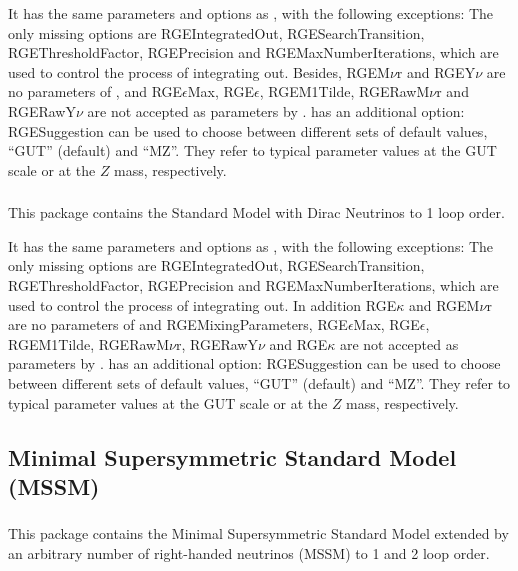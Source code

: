 \documentclass[10pt,a4paper,twoside]{scrartcl}
\begin{document}
\vspace{2ex} It has the same parameters and options as ,
with the following exceptions:  The only
missing options are RGEIntegratedOut, RGESearchTransition, RGEThresholdFactor,
RGEPrecision and RGEMaxNumberIterations, which are used to control the process
of integrating out.  Besides, RGEM$\nu$r and RGEY$\nu$ are no parameters of
, and RGE$\epsilon$Max, RGE$\epsilon$, RGEM1Tilde, RGERawM$\nu$r and RGERawY$\nu$ are not accepted as
parameters by .   has
an additional option: RGESuggestion can be used to choose between
different sets of default values, ``GUT'' (default) and ``MZ''.  They
refer to typical parameter values at the GUT scale or at the $Z$ mass,
respectively.

\subsubsection[\package{RGESMDirac}]{}
This package contains the Standard Model with Dirac Neutrinos to 1 loop order.

\vspace{2ex} It has the same parameters and options as ,
with the following exceptions:  The only
missing options are RGEIntegratedOut, RGESearchTransition, RGEThresholdFactor,
RGEPrecision and RGEMaxNumberIterations, which are used to control the process
of integrating out.  In addition RGE$\kappa$ and RGEM$\nu$r are no parameters of
 and RGEMixingParameters, RGE$\epsilon$Max, RGE$\epsilon$, RGEM1Tilde, RGERawM$\nu$r, RGERawY$\nu$ and RGE$\kappa$ are not
accepted as parameters by .
 has an additional option: RGESuggestion can be
used to choose between different sets of default values, ``GUT''
(default) and ``MZ''.  They refer to typical parameter values at the GUT
scale or at the $Z$ mass, respectively.


\subsection{Minimal Supersymmetric Standard Model (MSSM)}

\subsubsection[\package{RGEMSSM}]{}
This package contains the Minimal Supersymmetric Standard Model extended by an arbitrary number of 
right-handed neutrinos (MSSM) to 1 and 2 loop order.
\end{document}
